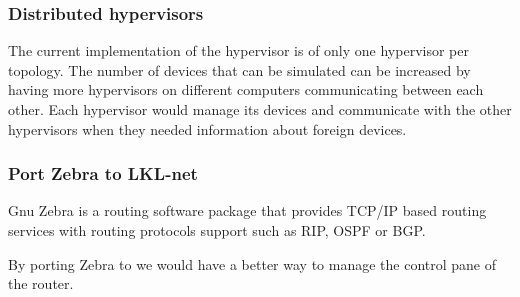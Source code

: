 \subsubsection{Distributed hypervisors}

The current implementation of the hypervisor is of only one hypervisor per topology. The number of devices that can be
simulated can be increased by having more hypervisors on different computers communicating between each other. Each hypervisor 
would manage its devices and communicate with the other hypervisors when they needed information about foreign devices.

\subsubsection{Port Zebra to LKL-net}

Gnu Zebra is a routing software package that provides TCP/IP based routing services with routing protocols support such
as RIP, OSPF or BGP. 

By porting Zebra to \textbf{\project} we would have a better way to manage the control pane of the router.
